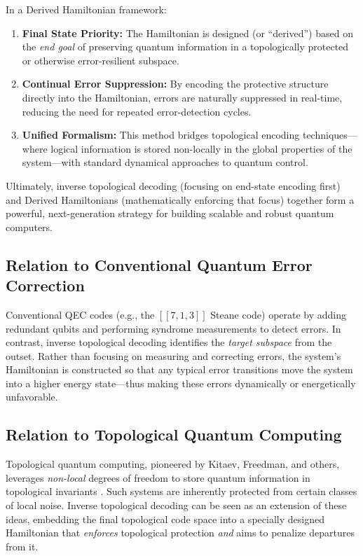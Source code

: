 \documentclass[11pt]{article}
\begin{document}
In a Derived Hamiltonian framework:
\begin{enumerate}
    \item \textbf{Final State Priority:} The Hamiltonian is designed (or “derived”) based on the \emph{end goal} of preserving quantum information in a topologically protected or otherwise error-resilient subspace.
    \item \textbf{Continual Error Suppression:} By encoding the protective structure directly into the Hamiltonian, errors are naturally suppressed in real-time, reducing the need for repeated error-detection cycles.
    \item \textbf{Unified Formalism:} This method bridges topological encoding techniques—where logical information is stored non-locally in the global properties of the system—with standard dynamical approaches to quantum control.
\end{enumerate}

Ultimately, inverse topological decoding (focusing on end-state encoding first) and Derived Hamiltonians (mathematically enforcing that focus) together form a powerful, next-generation strategy for building scalable and robust quantum computers.

\subsection{Relation to Conventional Quantum Error Correction}
Conventional QEC codes (e.g., the $[[7,1,3]]$ Steane code) operate by adding redundant qubits and performing syndrome measurements to detect errors. In contrast, inverse topological decoding identifies the \emph{target subspace} from the outset. Rather than focusing on measuring and correcting errors, the system's Hamiltonian is constructed so that any typical error transitions move the system into a higher energy state---thus making these errors dynamically or energetically unfavorable.

\subsection{Relation to Topological Quantum Computing}
Topological quantum computing, pioneered by Kitaev, Freedman, and others, leverages \emph{non-local} degrees of freedom to store quantum information in topological invariants \cite{Kitaev, Freedman}. Such systems are inherently protected from certain classes of local noise. Inverse topological decoding can be seen as an extension of these ideas, embedding the final topological code space into a specially designed Hamiltonian that \emph{enforces} topological protection \textit{and} aims to penalize departures from it.
\end{document}
